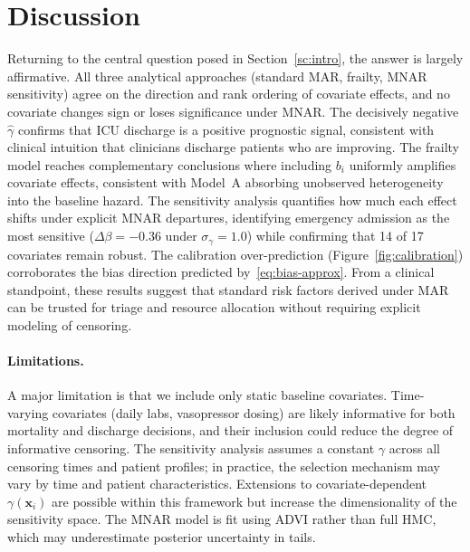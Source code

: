 \documentclass[twoside,11pt]{article}
\newcommand{\bx}{\mathbf{x}}
\begin{document}
\section{Discussion} \label{sc:discussion}
 
Returning to the central question posed in Section~\ref{sc:intro}, the answer is largely affirmative. All three analytical approaches (standard MAR, frailty, MNAR sensitivity) agree on the direction and rank ordering of covariate effects, and no covariate changes sign or loses significance under MNAR. The decisively negative $\hat{\gamma}$ confirms that ICU discharge is a positive prognostic signal, consistent with clinical intuition that clinicians discharge patients who are improving. The frailty model reaches complementary conclusions where including $b_i$ uniformly amplifies covariate effects, consistent with Model~A absorbing unobserved heterogeneity into the baseline hazard. The sensitivity analysis quantifies how much each effect shifts under explicit MNAR departures, identifying emergency admission as the most sensitive ($\Delta\beta = -0.36$ under $\sigma_\gamma = 1.0$) while confirming that 14 of 17 covariates remain robust. The calibration over-prediction (Figure~\ref{fig:calibration}) corroborates the bias direction predicted by~\eqref{eq:bias-approx}. From a clinical standpoint, these results suggest that standard risk factors derived under MAR can be trusted for triage and resource allocation without requiring explicit modeling of censoring. 
 
\paragraph{Limitations.}
A major limitation is that we include only static baseline covariates. Time-varying covariates (daily labs, vasopressor dosing) are likely informative for both mortality and discharge decisions, and their inclusion could reduce the degree of informative censoring. The sensitivity analysis assumes a constant $\gamma$ across all censoring times and patient profiles; in practice, the selection mechanism may vary by time and patient characteristics. Extensions to covariate-dependent $\gamma(\bx_i)$ are possible within this framework but increase the dimensionality of the sensitivity space. The MNAR model is fit using ADVI rather than full HMC, which may underestimate posterior uncertainty in tails.
 
\end{document}
